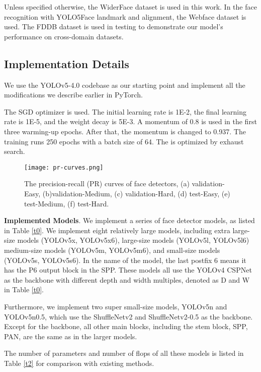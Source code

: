 \documentclass[conference]{IEEEtran}
\begin{document}
Unless specified otherwise, the WiderFace dataset \cite{WiderFace} is used in this work. In the face recognition with YOLO5Face landmark and alignment, the Webface dataset \cite{webface} is used. The FDDB dataset \cite{fddb} is used in testing to demonstrate our model's performance on cross-domain datasets.   

\subsection{Implementation Details}

We use the YOLOv5-4.0 codebase \cite{YOLOv5} as our starting point and implement all the modifications we describe earlier in PyTorch.  

The SGD optimizer is used. The initial learning rate is 1E-2, the final learning rate is 1E-5, and the weight decay is 5E-3. A momentum of 0.8 is used in the first three warming-up epochs. After that, the momentum is changed to 0.937. The training runs 250 epochs with a batch size of 64. The  is optimized by exhaust search.     

\begin{figure*}
    \centering
    \texttt{[image: pr-curves.png]}
    \caption{The precision-recall (PR) curves of face detectors, (a) validation-Easy, (b)validation-Medium, (c) validation-Hard, (d) test-Easy, (e) test-Medium, (f) test-Hard. }
    \label{pr}
\end{figure*}

\textbf{Implemented Models}. We implement a series of face detector models, as listed in Table \ref{t0}. We implement eight relatively large models, including extra large-size models (YOLOv5x, YOLOv5x6), large-size models (YOLOv5l, YOLOv5l6) medium-size models (YOLOv5m, YOLOv5m6), and small-size models (YOLOv5s, YOLOv5s6). In the name of the model, the last postfix 6 means it has the P6 output block in the SPP. These models all use the YOLOv4 CSPNet as the backbone with different depth and width multiples, denoted as D and W in Table \ref{t0}. 

Furthermore, we implement two super small-size models, YOLOv5n and YOLOv5n0.5, which use the ShuffleNetv2 and ShuffleNetv2-0.5 \cite{ShuffleNetv2} as the backbone. Except for the backbone, all other main blocks, including the stem block, SPP, PAN, are the same as in the larger models. 

The number of parameters and number of flops of all these models is listed in Table \ref{t2} for comparison with existing methods. 
\end{document}
